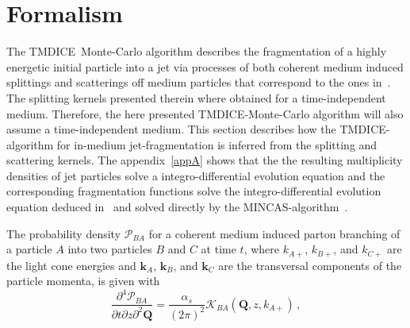 \documentclass[preprint,12pt]{elsarticle}
\newcommand{\tmdice}{{\sf TMDICE}}
\newcommand{\mincas}{{\sf MINCAS}}
\begin{document}
\section{Formalism}
\label{sec2}
The \tmdice\, Monte-Carlo algorithm describes the fragmentation of a highly energetic initial particle into a jet via processes of both coherent medium induced splittings and scatterings off medium particles that correspond to the ones in~\cite{Blaizot:2012fh,Blaizot:2013vha,Blanco:2021usa}. 
The splitting kernels presented therein where obtained for a time-independent medium. 
Therefore, the here presented \tmdice-Monte-Carlo algorithm will also assume a time-independent medium. 
This section describes how the \tmdice-algorithm for in-medium jet-fragmentation is inferred from the splitting and scattering kernels. The appendix~\ref{appA} shows that the the resulting multiplicity densities of jet particles solve a integro-differential evolution equation and the corresponding fragmentation functions solve the integro-differential evolution equation deduced in~\cite{Blaizot:2013vha} and solved directly by the \mincas-algorithm~\cite{Kutak:2018dim,Blanco:2020uzy,Blanco:2021usa}.

The probability density $\mathcal{P}_{BA}$ for a coherent medium induced parton branching of a particle $A$ into two particles $B$ and $C$ at time $t$, where $k_{A+}$, $k_{B+}$, and $k_{C+}$ are the light cone energies and $\mathbf{k}_{A}$, $\mathbf{k}_{B}$, and $\mathbf{k}_{C}$ are the transversal components of the particle momenta, is given with~\cite{Blaizot:2012fh,Blaizot:2013vha,Blanco:2021usa}
%
\begin{equation}
    \frac{\partial^4 \mathcal{P}_{BA}}{\partial t \partial z \partial^2 \mathbf{Q} }=\frac{\alpha_s}{(2\pi)^2}\mathcal{K}_{BA} (\mathbf{Q},z, k_{A+})\,,
\end{equation}
\end{document}
